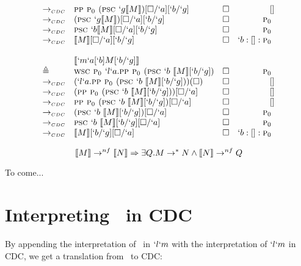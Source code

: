 \begin{Proof}
\[\begin{array}{llrr}
  \tocdc\    & \pp \gp (\psc `g \tr{M})[\square/`a][`b/`g]          & \square & []  \\
  \tocdc\    & (\psc `g \tr{M})[\square/`a][`b/`g]                  & \square & \gp  \\
  \tocdc\    & \psc `b \tr{M}[\square/`a][`b/`g]                    & \square & \gp  \\
  \tocdc\    & \tr{M}[\square/`a][`b/`g]                            & \square & `b:[]:\gp  \\
  \\
             & \tr{`m`a[`b]M[`b/`g]} \\
  \triangleq & \wsc \gp `l`a.\pp \gp (\psc `b\ \tr{M}[`b/`g])   & \square & \gp       \\
  \tocdc\     & (`l`a.\pp \gp (\psc `b\ \tr{M}[`b/`g]))(\square) & \square & []        \\
  \tocdc\     & (\pp \gp (\psc `b\ \tr{M}[`b/`g]))[\square/`a]   & \square & []        \\
  \tocdc\     & \pp \gp (\psc `b\ \tr{M}[`b/`g])[\square/`a]     & \square & []        \\
  \tocdc\     & (\psc `b\ \tr{M}[`b/`g])[\square/`a]             & \square & \gp       \\
  \tocdc\     & \psc `b\ \tr{M}[`b/`g][\square/`a]               & \square & \gp       \\
  \tocdc\     & \tr{M}[`b/`g][\square/`a]                        & \square & `b:[]:\gp \\
\end{array}
\]
\end{Proof}

\begin{theorem}[Completeness of $\tr{`.}$]
\[
  \llbracket M \rrbracket \to^{nf} \llbracket N \rrbracket \Rightarrow \exists Q. M \to^* N \land \llbracket N \rrbracket \to^{nf} Q
\]
\end{theorem}
\begin{Proof}
  To come...
\end{Proof}


\section{Interpreting \ltry\ in CDC}

  By appending the interpretation of \ltry\ in $`l`m$ with the interpretation of
  $`l`m$ in CDC, we get a translation from \ltry\ to CDC:

